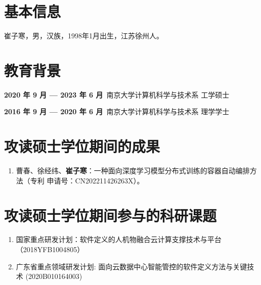 \section*{基本信息}
\noindent 崔子寒，男，汉族，1998年1月出生，江苏徐州人。

\section*{教育背景}

\noindent \textbf{2020 年 9 月 — 2023 年 6 月}~南京大学计算机科学与技术系 \hfill 工学硕士

\noindent \textbf{2016 年 9 月 — 2020 年 6 月}~南京大学计算机科学与技术系 \hfill 理学学士

\section*{攻读硕士学位期间的成果}
\begin{enumerate}[label=\arabic*., labelindent=0em, leftmargin=*]
    \item 曹春、徐经纬、\textbf{崔子寒}：一种面向深度学习模型分布式训练的容器自动编排方法（专利
    申请号：CN202211426263X）。
\end{enumerate}

\section*{攻读硕士学位期间参与的科研课题}
\begin{enumerate}[label=\arabic*., labelindent=0em, leftmargin=*]
    \item 国家重点研发计划：软件定义的人机物融合云计算支撑技术与平台（2018YFB1004805）
    \item 广东省重点领域研发计划: 面向云数据中心智能管控的软件定义方法与关键技术 (2020B010164003)
    
\end{enumerate}